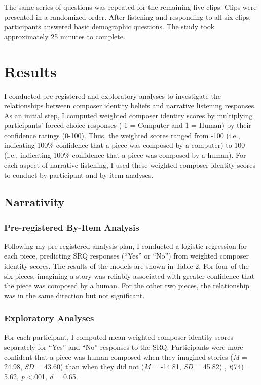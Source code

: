 \documentclass[12pt,twoside]{reedthesis}
\begin{document}
The same series of questions was repeated for the remaining five clips. Clips were presented in a randomized order. After listening and responding to all six clips, participants answered basic demographic questions. The study took approximately 25 minutes to complete. 

\section*{Results}

I conducted pre-registered and exploratory analyses to investigate the relationships between composer identity beliefs and narrative listening responses. As an initial step, I computed weighted composer identity scores by multiplying participants’ forced-choice responses (-1 = Computer and 1 = Human) by their confidence ratings (0-100). Thus, the weighted scores ranged from -100 (i.e., indicating 100\% confidence that a piece was composed by a computer) to 100 (i.e., indicating 100\% confidence that a piece was composed by a human). For each aspect of narrative listening, I used these weighted composer identity scores to conduct by-participant and by-item analyses. 

\subsection*{Narrativity}
\subsubsection*{Pre-registered By-Item Analysis}
Following my pre-registered analysis plan, I conducted a logistic regression for each piece, predicting SRQ responses (“Yes” or “No”) from weighted composer identity scores. The results of the models are shown in Table 2. For four of the six pieces, imagining a story was reliably associated with greater confidence that the piece was composed by a human. For the other two pieces, the relationship was in the same direction but not significant.

\subsubsection*{Exploratory Analyses}

For each participant, I computed mean weighted composer identity scores separately for “Yes” and “No” responses to the SRQ. Participants were more confident that a piece was human-composed when they imagined stories (\emph{M} = 24.98, \emph{SD} = 43.60) than when they did not (\emph{M} = -14.81, \emph{SD} = 45.82) , \emph{t}(74) = 5.62, \emph{p} \textless .001, \emph{d} = 0.65. 
\end{document}
